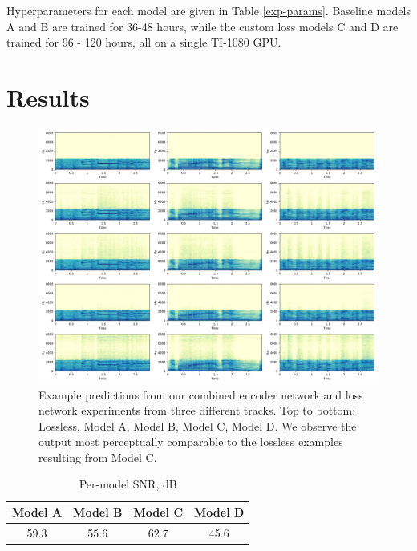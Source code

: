 \documentclass[sigconf]{acmart}
\begin{document}
Hyperparameters for each model are given in Table \ref{exp-params}.  Baseline models A and B are trained for 36-48 hours, while the custom loss models C and D are trained for 96 - 120 hours, all on a single TI-1080 GPU.

\section{Results}

\begin{figure}[h!]
    \centering
    \includegraphics[width=\textwidth]{samples/system_results.png}
    \caption{Example predictions from our combined encoder network and loss network experiments from three different tracks. Top to bottom: Lossless, Model A, Model B, Model C, Model D.  We observe the output most perceptually comparable to the lossless examples resulting from Model C.}
    \label{final-samples}
\end{figure}

\begin{table}[h!]
    \centering
    
    \begin{tabular}{cccc}
        \toprule
        \textbf{Model A} & \textbf{Model B} & \textbf{Model C} & \textbf{Model D} \\
        \midrule
        59.3 & 55.6 & 62.7 & 45.6 \\

        \bottomrule
    \end{tabular}
    \caption{Per-model SNR, dB}
    \label{quant-metrics}
\end{table}
\end{document}
